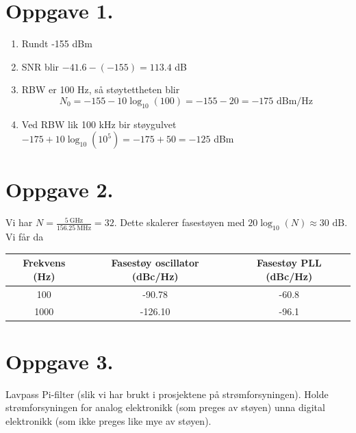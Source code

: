 \documentclass[a4paper,11pt,norsk]{article}
\begin{document}


\section*{Oppgave 1.}
\begin{enumerate}
    \item Rundt -155 dBm
    \item SNR blir $-41.6 - (-155) = 113.4$ dB
    \item RBW er 100 Hz, så støytettheten blir
        \[
            N_0 = -155 - 10 \log_{10}(100) = -155 - 20 = -175 \text{ dBm/Hz}
        \]
    \item Ved RBW lik 100 kHz bir støygulvet $-175 + 10 \log_{10}(10^{5}) = -175 + 50 = -125$ dBm
\end{enumerate}

\section*{Oppgave 2.}
Vi har $N = \frac{\SI{5}{\giga\hertz}}{\SI{156.25}{\mega\hertz}} = 32$. Dette skalerer fasestøyen med 
$20 \log_{10}(N) \approx 30 \text{ dB}$. Vi får da 

\begin{center}
\begin{tabular}{| c | c | c |}
    \hline
    \textbf{Frekvens (Hz)} & \textbf{Fasestøy oscillator (dBc/Hz)} & \textbf{Fasestøy PLL (dBc/Hz)} \\
    \hline
    \hline 
    100 & -90.78 & -60.8 \\
    \hline 
    1000 & -126.10 & -96.1 \\
    \hline 
\end{tabular}
\end{center}

\section*{Oppgave 3.}
Lavpass Pi-filter (slik vi har brukt i prosjektene på strømforsyningen).
Holde strømforsyningen for analog elektronikk (som preges av støyen) unna digital elektronikk (som ikke preges like mye av støyen).
\end{document}

